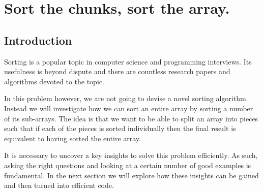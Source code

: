 %



\chapter{Sort the chunks, sort the array.}
\label{ch:max_num_chunks_sorted}
\section*{Introduction}

Sorting is a popular topic in computer science and programming interviews. 
Its usefulness is beyond dispute and  there are countless research papers and algorithms devoted to the topic. 

In this problem however,  we are not going to devise a novel sorting algorithm. Instead we will investigate how we can sort an entire array by sorting a number of its sub-arrays.
The idea is that we want to be able to  split an array into pieces such that if each of the pieces is sorted 
individually then the final result is equivalent to having sorted the entire array.

It is necessary to uncover a key insights  to solve this problem efficiently. 
As such, asking the right questions and looking at a certain number of good examples
is fundamental. In the next section we will explore how these insights can be gained and then turned into efficient code. 

